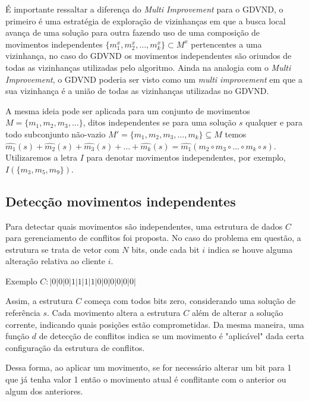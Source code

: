 É importante ressaltar a diferença do \emph{Multi Improvement} para o GDVND, o primeiro é uma estratégia de exploração de vizinhanças em que a busca local avança de uma solução para outra fazendo uso de uma composição de movimentos independentes $\{m_1^x, m_2^x, \dots, m_k^x\} \subset M^x$ pertencentes a uma vizinhança, no caso do GDVND os movimentos independentes são oriundos de todas as vizinhanças utilizadas pelo algoritmo.
Ainda na analogia com o \emph{Multi Improvement}, o GDVND poderia ser visto como um \emph{multi improvement} em que a sua vizinhança é a união de todas as vizinhanças utilizadas no GDVND.

A mesma ideia pode ser aplicada para um conjunto de movimentos $M = \{ m_1, m_2, m_3, ...\}$, ditos independentes se para uma solução $s$ qualquer e para todo subconjunto não-vazio $M' = \{ m_1, m_2, m_3, ..., m_k \} \subseteq M$ temos $\widehat{m_1}(s) + \widehat{m_2}(s) + \widehat{m_3}(s) + ... + \widehat{m_k}(s) = \widehat{m_1}(m_2 \circ m_3 \circ ...\circ m_k \circ s)$. 
Utilizaremos a letra $I$ para denotar movimentos independentes, por exemplo, $I(\{m_3, m_5, m_9\})$.

\subsection{Detecção movimentos independentes} \label{subsec:gdvndDetectarMovimentosIndependentes}

Para detectar quais movimentos são independentes, uma estrutura de dados $C$ para gerenciamento de conflitos foi proposta.
No caso do problema em questão, a estrutura se trata de vetor com $N$ bits, onde cada bit $i$ indica se houve alguma alteração relativa ao cliente $i$.

Exemplo $C: |0|0|0|1|1|1|1|0|0|0|0|0|0|$

Assim, a estrutura $C$ começa com todos bits zero, considerando uma solução de referência $s$.
Cada movimento altera a estrutura $C$ além de alterar a solução corrente, indicando quais posições estão comprometidas.
Da mesma maneira, uma função $d$ de detecção de conflitos indica se um movimento é "aplicável" dada certa configuração da estrutura de conflitos.

Dessa forma, ao aplicar um movimento, se for necessário alterar um bit para 1 que já tenha valor 1 então o movimento atual é conflitante com o anterior ou algum dos anteriores.

